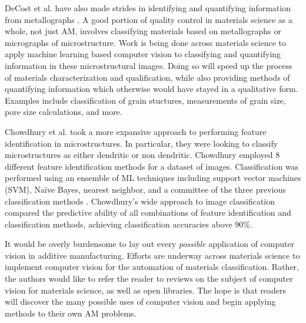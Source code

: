 DeCost et al. have also made strides in identifying and quantifying information from metallographs \cite{DeCost2015, DeCost2017b, Ling2017a}. A good portion of quality control in materials science as a whole, not just AM, involves classifying materials based on metallographs or micrographs of microstructure. Work is being done across materials science to apply machine learning based computer vision to classifying and quantifying information in these microstructural images. Doing so will speed up the process of materials characterization and qualification, while also providing methods of quantifying information which otherwise would have stayed in a qualitative form. Examples include classification of grain stuctures, measurements of grain size, pore size calculations, and more.

Chowdhury et al. took a more expansive approach to performing feature identification in microstructures. In particular, they were looking to classify microstructures as either dendritic or non dendritic. Chowdhury employed 8 different feature identification methods for a dataset of images. Classification was performed using an ensemble of ML techniques including support vector machines (SVM), Na\"ive Bayes, nearest neighbor, and a committee of the three previous classification methods \cite{Chowdhury2016}. Chowdhury's wide approach to image classification compared the predictive ability of all combinations of feature identification and classification methods, achieving classification accuracies above 90\%. 

It would be overly burdensome to lay out every \textit{possible} application of computer vision in additive manufacturing. Efforts are underway across materials science to implement computer vision for the automation of materials classification. Rather, the authors would like to refer the reader to reviews on the subject of computer vision for materials science, as well as open libraries. The hope is that readers will discover the many possible uses of computer vision and begin applying methods to their own AM problems. 

